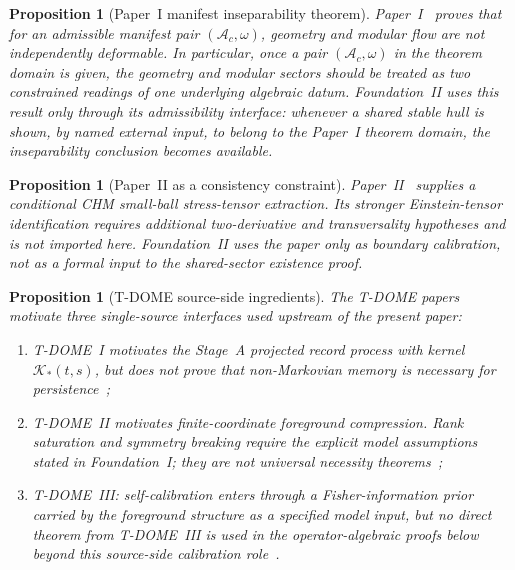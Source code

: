 \documentclass[12pt]{article}
\newtheorem{proposition}[theorem]{Proposition}
\theoremstyle{definition}
\theoremstyle{remark}
\begin{document}
\begin{proposition}[Paper~I manifest inseparability theorem]
\label{prop:appP1}
Paper~I~\cite{PaperI} proves that for an admissible manifest pair
\((\mathcal A_c,\omega)\), geometry and modular flow are not
independently deformable. In particular, once a pair
\((\mathcal A_c,\omega)\) in the theorem domain is given, the geometry
and modular sectors should be treated as two constrained readings of one
underlying algebraic datum. Foundation~II uses this result only through
its admissibility interface: whenever a shared stable hull is shown, by
named external input, to belong to the Paper~I theorem domain, the
inseparability conclusion becomes available.
\end{proposition}

\begin{proposition}[Paper~II as a consistency constraint]
\label{prop:appP2}
Paper~II~\cite{PaperII} supplies a conditional CHM small-ball
stress-tensor extraction. Its stronger Einstein-tensor identification
requires additional two-derivative and transversality hypotheses and is
not imported here. Foundation~II uses the paper only as boundary
calibration, not as a formal input to the shared-sector existence proof.
\end{proposition}

\begin{proposition}[T-DOME source-side ingredients]
\label{prop:appTDOME}
The T-DOME papers motivate three single-source interfaces used upstream
of the present paper:
\begin{enumerate}
\item T-DOME~I motivates the Stage~A projected record process with kernel
  \(\mathcal K_*(t,s)\), but does not prove that non-Markovian memory is
  necessary for persistence~\cite{TDOMEI,BreuerPetruccione2002};
\item T-DOME~II motivates finite-coordinate foreground compression.
  Rank saturation and symmetry breaking require the explicit model
  assumptions stated in Foundation~I; they are not universal necessity
  theorems~\cite{TDOMEII};
\item T-DOME~III: self-calibration enters through a Fisher-information
  prior carried by the foreground structure as a specified model input,
  but no direct theorem from T-DOME~III is used in the operator-algebraic
  proofs below beyond this source-side calibration role~\cite{TDOMEIII}.
\end{enumerate}
\end{proposition}
\end{document}
